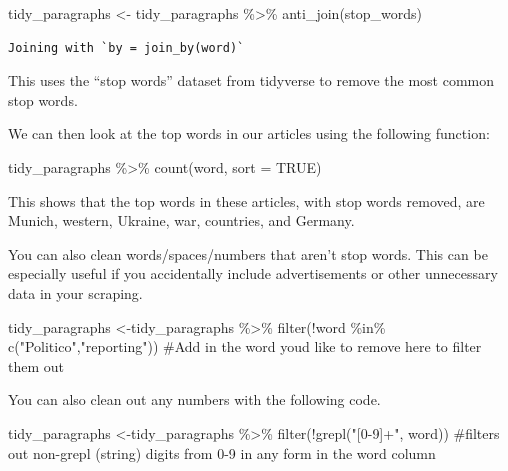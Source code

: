 \documentclass[
  letterpaper,
  DIV=11,
  numbers=noendperiod]{scrartcl}
\newenvironment{Shaded}{\begin{snugshade}}{\end{snugshade}}
\newcommand{\AttributeTok}[1]{\textcolor[rgb]{0.40,0.45,0.13}{#1}}
\newcommand{\CommentTok}[1]{\textcolor[rgb]{0.37,0.37,0.37}{#1}}
\newcommand{\ConstantTok}[1]{\textcolor[rgb]{0.56,0.35,0.01}{#1}}
\newcommand{\FunctionTok}[1]{\textcolor[rgb]{0.28,0.35,0.67}{#1}}
\newcommand{\NormalTok}[1]{\textcolor[rgb]{0.00,0.23,0.31}{#1}}
\newcommand{\OtherTok}[1]{\textcolor[rgb]{0.00,0.23,0.31}{#1}}
\newcommand{\SpecialCharTok}[1]{\textcolor[rgb]{0.37,0.37,0.37}{#1}}
\newcommand{\StringTok}[1]{\textcolor[rgb]{0.13,0.47,0.30}{#1}}
\begin{document}
\begin{Shaded}
\begin{Highlighting}[]
\NormalTok{tidy\_paragraphs }\OtherTok{\textless{}{-}}\NormalTok{ tidy\_paragraphs }\SpecialCharTok{\%\textgreater{}\%}
  \FunctionTok{anti\_join}\NormalTok{(stop\_words)}
\end{Highlighting}
\end{Shaded}

\begin{verbatim}
Joining with `by = join_by(word)`
\end{verbatim}

This uses the ``stop words'' dataset from tidyverse to remove the most
common stop words.

We can then look at the top words in our articles using the following
function:

\begin{Shaded}
\begin{Highlighting}[]
\NormalTok{tidy\_paragraphs }\SpecialCharTok{\%\textgreater{}\%}
  \FunctionTok{count}\NormalTok{(word, }\AttributeTok{sort =} \ConstantTok{TRUE}\NormalTok{) }
\end{Highlighting}
\end{Shaded}

This shows that the top words in these articles, with stop words
removed, are Munich, western, Ukraine, war, countries, and Germany.

You can also clean words/spaces/numbers that aren't stop words. This can
be especially useful if you accidentally include advertisements or other
unnecessary data in your scraping.

\begin{Shaded}
\begin{Highlighting}[]
\NormalTok{tidy\_paragraphs }\OtherTok{\textless{}{-}}\NormalTok{tidy\_paragraphs }\SpecialCharTok{\%\textgreater{}\%}
  \FunctionTok{filter}\NormalTok{(}\SpecialCharTok{!}\NormalTok{word }\SpecialCharTok{\%in\%} \FunctionTok{c}\NormalTok{(}\StringTok{"Politico"}\NormalTok{,}\StringTok{"reporting"}\NormalTok{)) }\CommentTok{\#Add in the word you\textquotesingle{}d like to remove here to filter them out}
\end{Highlighting}
\end{Shaded}

You can also clean out any numbers with the following code.

\begin{Shaded}
\begin{Highlighting}[]
\NormalTok{tidy\_paragraphs }\OtherTok{\textless{}{-}}\NormalTok{tidy\_paragraphs }\SpecialCharTok{\%\textgreater{}\%}
          \FunctionTok{filter}\NormalTok{(}\SpecialCharTok{!}\FunctionTok{grepl}\NormalTok{(}\StringTok{"[0{-}9]+"}\NormalTok{, word)) }
\CommentTok{\#filters out non{-}grepl (string) digits from 0{-}9 in any form in the word column}
\end{Highlighting}
\end{Shaded}
\end{document}
